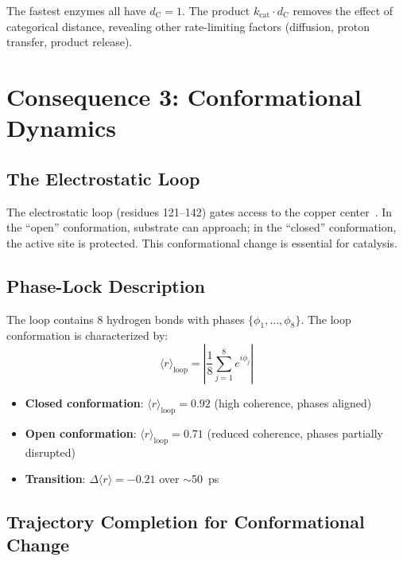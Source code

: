 \documentclass[twocolumn,aps,prx,superscriptaddress,longbibliography]{revtex4-2}
\theoremstyle{remark}
\newcommand{\kcat}{k_\text{cat}}
\newcommand{\dC}{d_\text{C}}
\newcommand{\orderpar}{\langle r \rangle}
\begin{document}
The fastest enzymes all have $\dC = 1$. The product $\kcat \cdot \dC$
removes the effect of categorical distance, revealing other rate-limiting
factors (diffusion, proton transfer, product release).

\section{Consequence 3: Conformational Dynamics}
\label{sec:conformational}

\subsection{The Electrostatic Loop}

The electrostatic loop (residues 121--142) gates access to the copper
center~\cite{Getzoff1983}. In the ``open'' conformation, substrate can
approach; in the ``closed'' conformation, the active site is protected.
This conformational change is essential for catalysis.

\subsection{Phase-Lock Description}

The loop contains 8 hydrogen bonds with phases $\{\phi_1, \ldots, \phi_8\}$.
The loop conformation is characterized by:
\begin{equation}
\orderpar_\text{loop} = \left| \frac{1}{8} \sum_{j=1}^{8} e^{i\phi_j} \right|
\label{eq:loop_order}
\end{equation}

\begin{itemize}
    \item \textbf{Closed conformation}: $\orderpar_\text{loop} = 0.92$
    (high coherence, phases aligned)

    \item \textbf{Open conformation}: $\orderpar_\text{loop} = 0.71$
    (reduced coherence, phases partially disrupted)

    \item \textbf{Transition}: $\Delta\orderpar = -0.21$ over $\sim$50~ps
\end{itemize}

\subsection{Trajectory Completion for Conformational Change}
\end{document}
